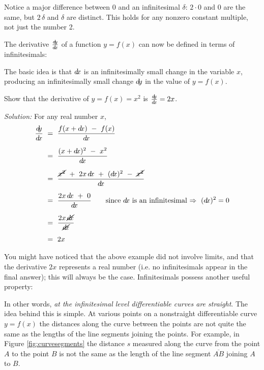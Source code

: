 Notice a major difference between 0 and an infinitesimal $\delta$: $2 \cdot 0$
and $0$ are the same, but $2\,\delta$ and $\delta$ are distinct. This holds for
any nonzero constant multiple, not just the number 2.

The derivative $\frac{d\negmedspace y}{d\!x}$ of a function $y=f(x)$ can now be defined in terms of
infinitesimals:

The basic idea is that $d\!x$ is an infinitesimally small change in the variable
$x$, producing an infinitesimally small change $d\!y$ in the value of $y=f(x)$.
\begin{exmp}
 Show that the derivative of $y=f(x)=x^2$ is $\frac{d\negmedspace y}{d\!x} = 2x$.\vspace{1mm}
 \par\noindent\emph{Solution:} For any real number $x$,
 \begin{align*}
  \dydx ~&=~ \frac{f(x+\dx) ~-~ f(x)}{\dx}\\[6pt]
  &=~ \frac{(x+\dx)^2 ~-~ x^2}{\dx}\\[6pt]
  &=~ \frac{\cancel{x^2} ~+~ 2x\,\dx ~+~ (\dx)^2 ~-~ \cancel{x^2}}{\dx}\\[6pt]
  &=~ \frac{2x\,\dx ~+~ 0}{\dx}\qquad\text{since $\dx$ is an
   infinitesimal $\Rightarrow ~(\dx)^2 = 0$}\\[6pt]
  &=~ \frac{2x\,\cancel{\dx}}{\cancel{\dx}}\\[4pt]
  &=~ 2x
 \end{align*}
\end{exmp}
\divider
\newpage
You might have noticed that the above example did not involve limits, and that
the derivative $2x$ represents a real number (i.e. no infinitesimals appear in
the final answer); this will always be the case. Infinitesimals possess another
useful property:


In other words, \emph{at the infinitesimal level differentiable curves are
straight}. The idea behind this is simple. At various points on a nonstraight
differentiable curve $y=f(x)$ the distances along the curve between the points
are not quite the same as the lengths of the line segments joining the points.
For example, in Figure \ref{fig:curvesegments} the distance $s$ measured along
the curve from the point $A$ to the point $B$ is not the same as the length of
the line segment $\overline{AB}$ joining $A$ to $B$.

